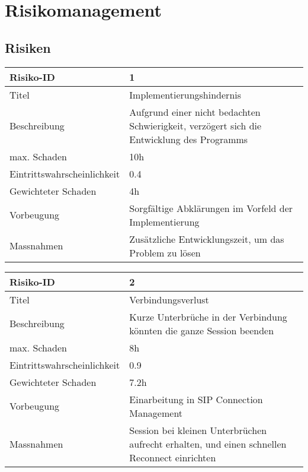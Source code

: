 \chapter{Risikomanagement}
\section{Risiken}

\noindent
\begin{tabular}{|p{} | p{} |}
	\hline	
	Risiko-ID & 1 \\
	\hline
	Titel & Implementierungshindernis \\
	Beschreibung & Aufgrund einer nicht bedachten Schwierigkeit, verzögert sich die Entwicklung des Programms \\
	max. Schaden	& 10h \\
	Eintrittswahrscheinlichkeit & 0.4 \\
	Gewichteter Schaden	& 4h \\
	Vorbeugung	& Sorgfältige Abklärungen im Vorfeld der Implementierung \\
	Massnahmen	& Zusätzliche Entwicklungszeit, um das Problem zu lösen \\
	\hline
\end{tabular}
\hspace{0.5cm}
\newline

\noindent
\begin{tabular}{|p{} | p{} |}
	\hline	
	Risiko-ID & 2 \\
	\hline
	Titel & Verbindungsverlust \\
	Beschreibung & Kurze Unterbrüche in der Verbindung könnten die ganze Session beenden \\
	max. Schaden	& 8h \\
	Eintrittswahrscheinlichkeit & 0.9 \\
	Gewichteter Schaden	& 7.2h \\
	Vorbeugung	& Einarbeitung in SIP Connection Management \\
	Massnahmen	& Session bei kleinen Unterbrüchen aufrecht erhalten, und einen schnellen Reconnect einrichten \\
	\hline
\end{tabular}
\hspace{0.5cm}
\newline
	
